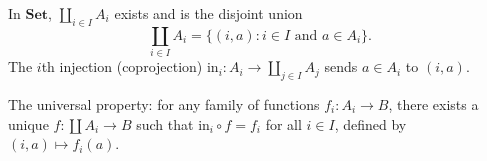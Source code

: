 In $\mathbf{Set}$, $\coprod_{i \in I} A_i$ exists and is the disjoint union
$$\coprod_{i \in I} A_i = \{(i, a) : i \in I \text{ and } a \in A_i\}.$$
The $i$th injection (coprojection) $\text{in}_i: A_i \to \coprod_{j \in I} A_j$ sends $a \in A_i$ to $(i, a)$.

The universal property: for any family of functions $f_i: A_i \to B$, there exists a unique $f: \coprod A_i \to B$ such that $\text{in}_i \circ f = f_i$ for all $i \in I$, defined by $(i, a) \mapsto f_i(a)$.
